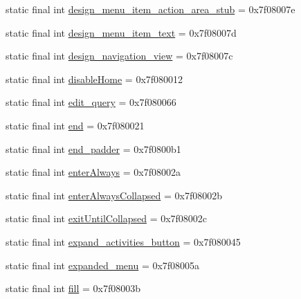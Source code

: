 \begin{CompactItemize}
static final int \hyperlink{classandroid_1_1support_1_1graphics_1_1drawable_1_1animated_1_1_r_1_1id_cf8d81ec7d8df18a63a228a56a3c371e}{design\_\-menu\_\-item\_\-action\_\-area\_\-stub} = 0x7f08007e
\item 
static final int \hyperlink{classandroid_1_1support_1_1graphics_1_1drawable_1_1animated_1_1_r_1_1id_3951c0f413aef66e81d9cc650c6b4c73}{design\_\-menu\_\-item\_\-text} = 0x7f08007d
\item 
static final int \hyperlink{classandroid_1_1support_1_1graphics_1_1drawable_1_1animated_1_1_r_1_1id_23dd28bfdb2988001af498348e161efb}{design\_\-navigation\_\-view} = 0x7f08007c
\item 
static final int \hyperlink{classandroid_1_1support_1_1graphics_1_1drawable_1_1animated_1_1_r_1_1id_bb8d65cd2405d0a9ba3fa61c9384a8fc}{disableHome} = 0x7f080012
\item 
static final int \hyperlink{classandroid_1_1support_1_1graphics_1_1drawable_1_1animated_1_1_r_1_1id_1299be78ca61ea2cedfa24c975806e8a}{edit\_\-query} = 0x7f080066
\item 
static final int \hyperlink{classandroid_1_1support_1_1graphics_1_1drawable_1_1animated_1_1_r_1_1id_b1025bc614bd18d450d0060a90d180dd}{end} = 0x7f080021
\item 
static final int \hyperlink{classandroid_1_1support_1_1graphics_1_1drawable_1_1animated_1_1_r_1_1id_00367d31ae4e25c273aa594c722ed55d}{end\_\-padder} = 0x7f0800b1
\item 
static final int \hyperlink{classandroid_1_1support_1_1graphics_1_1drawable_1_1animated_1_1_r_1_1id_1158bb64da31b3fa318f6778b24e5ab3}{enterAlways} = 0x7f08002a
\item 
static final int \hyperlink{classandroid_1_1support_1_1graphics_1_1drawable_1_1animated_1_1_r_1_1id_ec05e0b809c824514a8655f821e920d0}{enterAlwaysCollapsed} = 0x7f08002b
\item 
static final int \hyperlink{classandroid_1_1support_1_1graphics_1_1drawable_1_1animated_1_1_r_1_1id_29ca6832595a9269dee4872f8c270a60}{exitUntilCollapsed} = 0x7f08002c
\item 
static final int \hyperlink{classandroid_1_1support_1_1graphics_1_1drawable_1_1animated_1_1_r_1_1id_5260206241d753b8a59e787b0f9b64bb}{expand\_\-activities\_\-button} = 0x7f080045
\item 
static final int \hyperlink{classandroid_1_1support_1_1graphics_1_1drawable_1_1animated_1_1_r_1_1id_ed3d2bfbc16cd430a7b83cbb349a9faf}{expanded\_\-menu} = 0x7f08005a
\item 
static final int \hyperlink{classandroid_1_1support_1_1graphics_1_1drawable_1_1animated_1_1_r_1_1id_6847e1f2cfd1746170241ddfb8da28a4}{fill} = 0x7f08003b

\end{CompactItemize}
